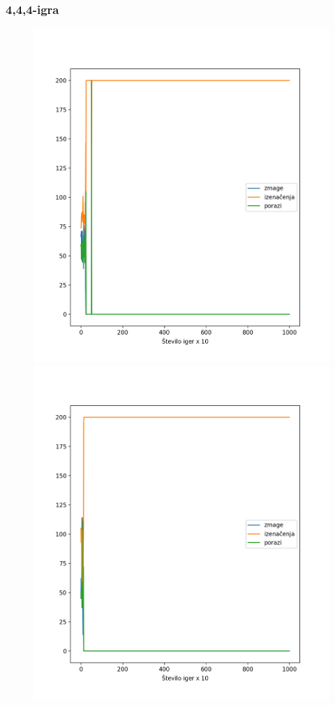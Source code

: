 \documentclass{beamer}    %
\begin{document}
\begin{frame}
    \frametitle{4,4,4-igra}
    \begin{figure}
        \includegraphics[scale=0.29]{slike/444-agent.png}
        \includegraphics[scale=0.29]{slike/444g-agent.png}
    \end{figure}
\end{frame}
\end{document}
